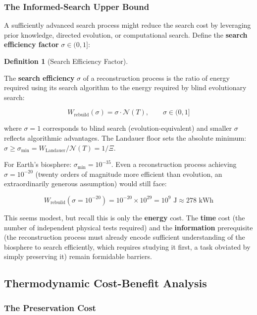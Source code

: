 \documentclass[11pt]{article}
\theoremstyle{plain}
\theoremstyle{definition}
\newtheorem{definition}{Definition}
\theoremstyle{remark}
\let\origsubsection\subsection
\renewcommand{\subsection}{\needspace{7\baselineskip}\origsubsection}
\let\origsubsubsection\subsubsection
\renewcommand{\subsubsection}{\needspace{4\baselineskip}\origsubsubsection}
\begin{document}
\subsubsection{The Informed-Search Upper
Bound}\label{the-informed-search-upper-bound}

A sufficiently advanced search process might reduce the search cost by
leveraging prior knowledge, directed evolution, or computational search.
Define the \textbf{search efficiency factor} \(\sigma \in (0, 1]\):

\begin{definition}[Search Efficiency Factor]
\label{def-search-efficiency-factor}

The \textbf{search efficiency} $\sigma$ of a reconstruction process is the ratio of energy required using its search algorithm to the energy required by blind evolutionary search:

$$W_{\text{rebuild}}(\sigma) = \sigma \cdot \mathcal{N}(T), \qquad \sigma \in (0, 1]$$

where $\sigma = 1$ corresponds to blind search (evolution-equivalent) and smaller $\sigma$ reflects algorithmic advantages. The Landauer floor sets the absolute minimum: $\sigma \geq \sigma_{\min} = W_{\text{Landauer}} / \mathcal{N}(T) = 1/\Xi$.
\end{definition}

For Earth's biosphere: \(\sigma_{\min} = 10^{-35}\). Even a
reconstruction process achieving \(\sigma = 10^{-20}\) (twenty orders of
magnitude more efficient than evolution, an extraordinarily generous
assumption) would still face:

\[W_{\text{rebuild}}(\sigma = 10^{-20}) = 10^{-20} \times 10^{29} = 10^{9} \text{ J} \approx 278 \text{ kWh}\]

This seems modest, but recall this is only the \textbf{energy} cost. The
\textbf{time} cost (the number of independent physical tests required)
and the \textbf{information} prerequisite (the reconstruction process
must already encode sufficient understanding of the biosphere to search
efficiently, which requires studying it first, a task obviated by simply
preserving it) remain formidable barriers.

\subsection{Thermodynamic Cost-Benefit
Analysis}\label{thermodynamic-cost-benefit-analysis}

\subsubsection{The Preservation Cost}\label{the-preservation-cost}
\end{document}
